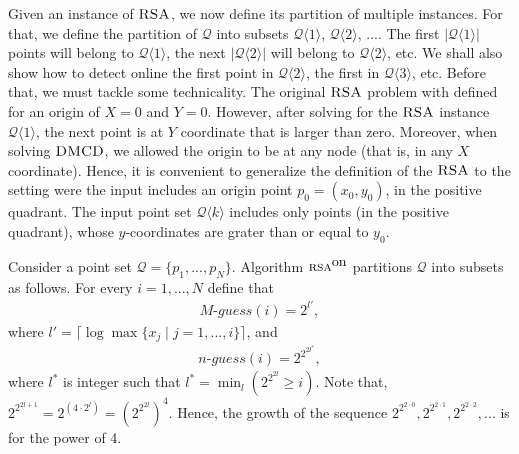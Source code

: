\documentclass[11pt]{article}
\newcommand{\DMCD}{\mbox{\sc DMCD}}
\newcommand{\RSA}{\mbox{\sc RSA}}
\newcommand{\lrangle}[1]{\langle #1\rangle}
\newcommand{\calQ}{\mathcal{Q}}
\newcommand{\onRSA}{\mbox{\sc rsa}^{\mbox{\upshape on}}}
\newcommand{\nguess}[0]{n\mbox{-}guess}
\newcommand{\Mguess}[0]{M\mbox{-}guess}
\newcommand{\tetration}[1]{2^{2^{2#1}}}
\begin{document}
Given an instance of $\RSA$, we now define its partition of multiple instances. For that, we define the partition of $\calQ$ into subsets $\calQ\lrangle{1}$, $\calQ\lrangle{2}$, .... The first $|\calQ\lrangle{1}|$ points will belong to $\calQ\lrangle{1}$, the next $|\calQ\lrangle{2}|$ will belong to $\calQ\lrangle{2}$, etc. We shall also show how to detect online the first point in $\calQ\lrangle{2}$, the first in $\calQ\lrangle{3}$, etc.
Before that, we must tackle some technicality. The original $\RSA$ problem with defined for an origin of $X=0$ and $Y=0$.
However, after solving for the $\RSA$ instance $\calQ\lrangle{1}$, the next point is at $Y$ coordinate that is larger than zero.
Moreover, when solving $\DMCD$, we allowed the origin to be at any node (that is, in any $X$ coordinate).
Hence, it is convenient to generalize
the definition of the $\RSA$ to the setting were the input includes an origin point $p_0=(x_0,y_0)$, in the positive quadrant. The input point set $\calQ\lrangle{k}$ includes only points (in the positive quadrant), whose $y$-coordinates are grater than or equal to $y_0$.




Consider a point set $\calQ=\{p_1,...,p_N\}$.
Algorithm $\onRSA$ partitions $\calQ$ into subsets as follows.
For every $i=1,...,N$ define that
\vspace{-0.0cm}
\begin{eqnarray}
\Mguess(i)=2^{l'},
\label{eq:def: Mguess}
\end{eqnarray}
where $l'=\lceil \log\max\{x_j\mid j=1,...,i\} \rceil$, and
\vspace{-0.0cm}
\begin{eqnarray}
\nguess(i)= \tetration{l^*},
\label{eq:def: nguess}
\end{eqnarray}
where $l^*$ is integer such that $l^*=\min_l(\tetration{l}\geq i)$.
Note that, $\tetration{l+1}=2^{(4\cdot2^l)}=(\tetration{l})^4$. Hence, the growth of the sequence $\tetration{\cdot0},\tetration{\cdot1},\tetration{\cdot2},...$ is for the power of 4.
\end{document}
